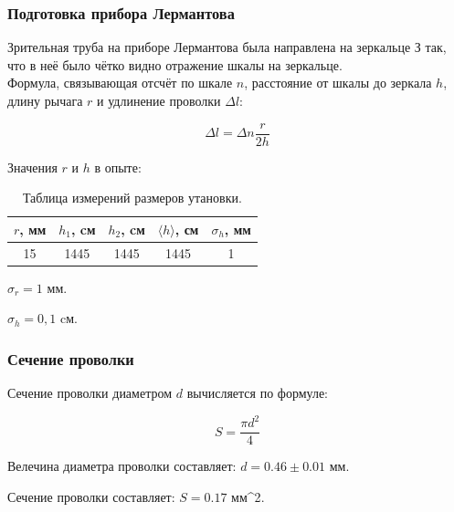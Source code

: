 \documentclass[a4paper]{article}
\begin{document}
\subsubsection {Подготовка прибора Лермантова}

Зрительная труба на приборе Лермантова была направлена на зеркальце З так, что в неё было чётко видно отражение шкалы на зеркальце.\\

Формула, связывающая отсчёт по шкале $n$, расстояние от шкалы до зеркала $h$, длину рычага $r$ и удлинение проволки $\Delta l$:

\begin{equation}\label{lermantov}
    {\Delta l}={\Delta n}\frac{r}{2h}
\end{equation}

Значения $r$ и $h$ в опыте:

\begin{table}[h!]
\begin{center}
\begin{tabular}{|c|c|c|c|c|}
\hline
$r$, мм   & $h_1$, cм   & $h_2$, cм   & $\langle h \rangle$, см   & $\sigma_h$, мм      \\ \hline

15   & 1445   & 1445   &1445   &{1}     \\ \hline

\end{tabular}
\caption{Таблица измерений размеров утановки.}
\end{center}
\end{table}

\item $\sigma_{r} = 1$ мм.
\item $\sigma_{h} = 0,1$ cм.\\




\subsubsection {Сечение проволки}

Сечение проволки диаметром $d$ вычисляется по формуле:

\begin{equation}\label{lermantov}
    {S}=\frac{\pi d^2}{4}
\end{equation}

\item Велечина диаметра проволки составляет: ${d} = {0.46} \pm {0.01}$ мм.\\
\item Сечение проволки составляет: ${S} = 0.17$ мм{^2}.\\
\end{document}
